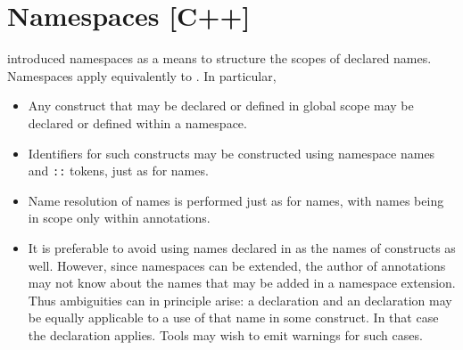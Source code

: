 \section{Namespaces [C++]}
\label{sec:namespaces}

\lang introduced namespaces as a means to structure the scopes of declared names. Namespaces apply equivalently to \NAME. In particular,
\begin{itemize}
\item Any \NAME construct that may be declared or defined 
in global scope may be declared or defined within a namespace.
\item Identifiers for such constructs may be constructed using namespace names and \lstinline|::| tokens, just as for \lang names.
\item Name resolution of \NAME names is performed just as for \lang names, with \NAME names being in scope only within \NAME annotations.
\item It is preferable to avoid using names declared in \lang as the names of \NAME constructs as well. However, since namespaces can be extended, the author of \NAME annotations may not know about the \lang names that may be added in a namespace extension. Thus ambiguities can in
principle arise: a \lang declaration and an \NAME
declaration may be equally applicable to a use of that name 
in some \NAME construct. In that case the \NAME declaration applies.
Tools may wish to emit warnings for such cases.

\end{itemize}

